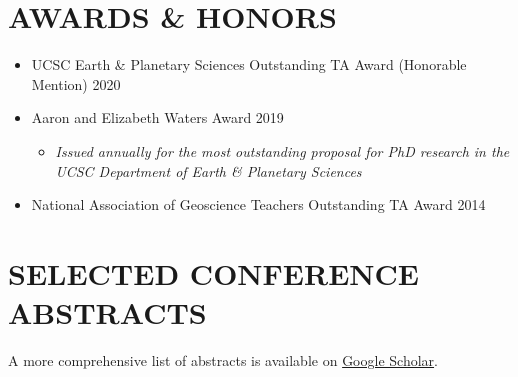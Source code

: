 \documentclass[10pt]{article}
\begin{document}

\section*{AWARDS \& HONORS}

\begin{itemize} [leftmargin=0pt,label={},itemsep=1ex]
	\item UCSC Earth \& Planetary Sciences Outstanding TA Award (Honorable Mention) \hfill 2020
	\item Aaron and Elizabeth Waters Award  \hfill 2019
	\begin{itemize} [label={}, rightmargin=30ex]
	\item \textit{Issued annually for the most outstanding proposal for PhD research in the UCSC Department of Earth \& Planetary Sciences}
	\end{itemize}
	\item National Association of Geoscience Teachers Outstanding TA Award \hfill 2014
\end{itemize}



\section*{SELECTED CONFERENCE ABSTRACTS}

\begin{center} A more comprehensive list of abstracts is available on \href{https://scholar.google.com/citations?user=KHLOvgcAAAAJ&hl=en}{Google Scholar}. \end{center}
\end{document}
